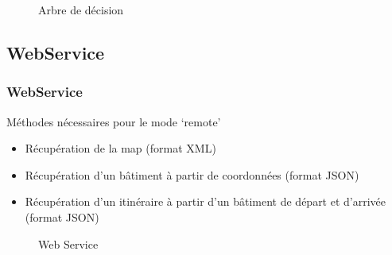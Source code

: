 \documentclass{beamer}
\begin{document}
\begin{frame}
\begin{figure}
\centering
{}
\caption{Arbre de décision}
\end{figure}
\end{frame}

\subsection{WebService}
\begin{frame}
\frametitle{WebService}
\begin{block}{Méthodes nécessaires pour le mode `remote'}
\begin{itemize}
\item Récupération de la map (format XML)
\item Récupération d'un bâtiment à partir de coordonnées (format JSON)
\item Récupération d'un itinéraire à partir d'un bâtiment de départ et d'arrivée (format JSON)
\end{itemize}
\end{block}
\end{frame}

\begin{frame}
\begin{figure}
\centering
{}
\caption{Web Service}
\end{figure}
\end{frame}
\end{document}
